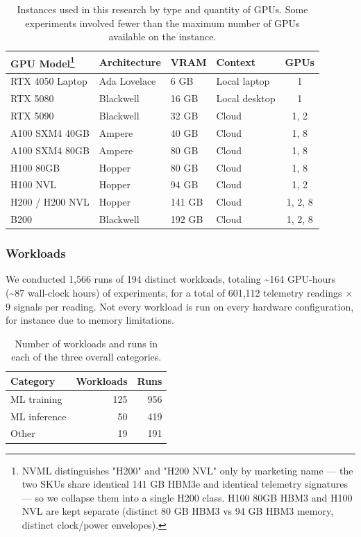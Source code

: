 \begin{table}[htbp]
\centering
\small
\begin{tabular}{llllc}
\toprule
\textbf{GPU Model}\footnote{NVML distinguishes "H200" and "H200 NVL" only by marketing name --- the two SKUs share identical 141 GB HBM3e and identical telemetry signatures --- so we collapse them into a single H200 class. H100 80GB HBM3 and H100 NVL are kept separate (distinct 80 GB HBM3 vs 94 GB HBM3 memory, distinct clock/power envelopes).} & \textbf{Architecture} & \textbf{VRAM} & \textbf{Context} & \textbf{GPUs} \\
\midrule
RTX 4050 Laptop & Ada Lovelace & 6 GB & Local laptop & 1 \\
RTX 5080 & Blackwell & 16 GB & Local desktop & 1 \\
RTX 5090 & Blackwell & 32 GB & Cloud & 1, 2 \\
A100 SXM4 40GB & Ampere & 40 GB & Cloud & 1, 8 \\
A100 SXM4 80GB & Ampere & 80 GB & Cloud & 1, 8 \\
H100 80GB & Hopper & 80 GB & Cloud & 1, 8 \\
H100 NVL & Hopper & 94 GB & Cloud & 1, 2 \\
H200 / H200 NVL & Hopper & 141 GB & Cloud & 1, 2, 8 \\
B200 & Blackwell & 192 GB & Cloud & 1, 2, 8 \\
\bottomrule
\end{tabular}
\caption{Instances used in this research by type and quantity of GPUs. Some experiments involved fewer than the maximum number of GPUs available on the instance.}
\label{tab:hw}
\end{table}

\subsubsection{Workloads}

We conducted 1,566 runs of 194 distinct workloads, totaling \textasciitilde{}164 GPU-hours (\textasciitilde{}87 wall-clock hours) of experiments, for a total of 601,112 telemetry readings $\times$ 9 signals per reading. Not every workload is run on every hardware configuration, for instance due to memory limitations.

\begin{table}[htbp]
\centering
\small
\begin{tabular}{lrr}
\toprule
Category & Workloads & Runs \\
\midrule
ML training & 125 & 956 \\
ML inference & 50 & 419 \\
Other & 19 & 191 \\
\bottomrule
\end{tabular}
\caption{Number of workloads and runs in each of the three overall categories.}
\label{tab:cat}
\end{table}

